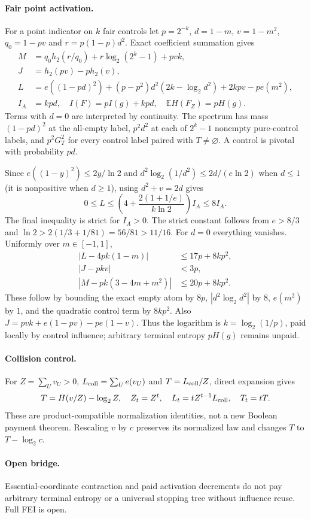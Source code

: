 \documentclass[11pt]{article}
\begin{document}
\paragraph{Fair point activation.}
For a point indicator on $k$ fair controls let $p=2^{-k}$, $d=1-m$, $v=1-m^2$,
$q_0=1-pv$ and $r=p(1-p)d^2$. Exact coefficient summation gives
\begin{align*}
 M&=q_0h_2(r/q_0)+r\log_2(2^k-1)+pvk,\\
 J&=h_2(pv)-p h_2(v),\\
 L&=e((1-pd)^2)+(p-p^2)d^2(2k-\log_2d^2)+2kpv-p e(m^2),\\
 I_A&=kpd,\quad I(F)=pI(g)+kpd,\quad \mathbb EH(F_Z)=pH(g).
\end{align*}
Terms with $d=0$ are interpreted by continuity.
The spectrum has mass $(1-pd)^2$ at the all-empty label, $p^2d^2$ at each
of $2^k-1$ nonempty pure-control labels, and $p^2G_T^2$ for every control
label paired with $T\ne\varnothing$. A control is pivotal with probability $pd$.

Since $e((1-y)^2)\le2y/\ln2$ and
$d^2\log_2(1/d^2)\le2d/(e\ln2)$ when $d\le1$ (it is nonpositive when $d\ge1$),
using $d^2+v=2d$ gives
\[
 0\le L\le\left(4+\frac{2(1+1/e)}{k\ln2}\right)I_A\le8I_A.
\]
The final inequality is strict for $I_A>0$. The strict constant follows from $e>8/3$ and
$\ln2>2(1/3+1/81)=56/81>11/16$. For $d=0$ everything vanishes.
Uniformly over $m\in[-1,1]$,
\begin{align*}
 |L-4pk(1-m)|&\le17p+8kp^2,\\
 |J-pkv|&<3p,\\
 |M-pk(3-4m+m^2)|&\le20p+8kp^2.
\end{align*}
These follow by bounding the exact empty atom by $8p$,
$|d^2\log_2d^2|$ by $8$, $e(m^2)$ by $1$, and the quadratic control
term by $8kp^2$. Also
$J=pvk+e(1-pv)-p e(1-v)$.
Thus the logarithm is $k=\log_2(1/p)$, paid locally by control influence;
arbitrary terminal entropy $pH(g)$ remains unpaid.

\paragraph{Collision control.}
For $Z=\sum_U v_U>0$, $L_{\rm coll}=\sum_U e(v_U)$ and
$T=L_{\rm coll}/Z$, direct expansion gives
\[
 T=H(v/Z)-\log_2Z,\quad Z_t=Z^t,\quad
 L_t=tZ^{t-1}L_{\rm coll},\quad T_t=tT.
\]
These are product-compatible normalization identities, not a new Boolean payment theorem.
Rescaling $v$ by $c$ preserves its normalized law and changes $T$ to $T-\log_2c$.

\paragraph{Open bridge.}
Essential-coordinate contraction and paid activation decrements do not pay arbitrary terminal
entropy or a universal stopping tree without influence reuse. Full FEI is open.
\end{document}
